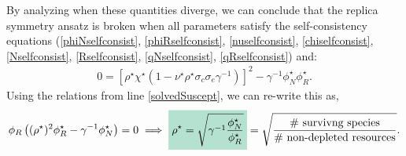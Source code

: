 \documentclass[10pt]{article}
\newcommand{\mathcolorbox}[1]{\colorbox{hlcol}{$\displaystyle #1$}}
\begin{document}
By analyzing when these quantities diverge, we can conclude that the replica symmetry ansatz is broken when all parameters satisfy the self-consistency equations (\ref{phiNselfconsist}, \ref{phiRselfconsist}, \ref{nuselfconsist}, \ref{chiselfconsist}, \ref{Nselfconsist}, \ref{Rselfconsist}, \ref{qNselfconsist}, \ref{qRselfconsist}) and:
\begin{align}
		0=\left[
		\rho^\star\chi^\star\left(
			1-\nu^\star \rho^\star \sigma_c \sigma_e\gamma^{-1}
		\right)
	\right]^2
	-\gamma^{-1}\phi_N^\star\phi_R^\star
	.
\end{align}
Using the relations from line \ref{solvedSuscept}, we can re-write this as,
\begin{align}
	\phi_R\left(
		(\rho^\star)^2\phi_R^\star-\gamma^{-1}\phi_N^\star
	\right)
	=0
	\implies
	\mathcolorbox{
	\rho^\star
	=
	\sqrt{\gamma^{-1}\frac{\phi_N^\star}{\phi_R^\star}}
	}
	=
	\sqrt{\frac{\text{\# survivng species}}{\text{\# non-depleted resources}}}.
\end{align}
\end{document}
